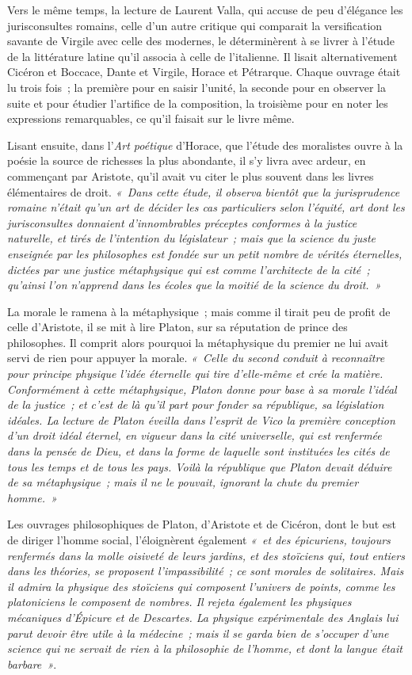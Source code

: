 \documentclass[french,twoside]{book} %
\begin{document}
Vers le même temps, la lecture de Laurent Valla, qui accuse de peu d’élégance les jurisconsultes romains, celle d’un autre critique qui comparait la versification savante de Virgile avec celle des modernes, le déterminèrent à se livrer à l’étude de la littérature latine qu’il associa à celle de l’italienne. Il lisait alternativement Cicéron et Boccace, Dante et Virgile, Horace et Pétrarque. Chaque ouvrage était lu trois fois ; la première pour en saisir l’unité, la seconde pour en observer la suite et pour étudier l’artifice de la composition, la troisième pour en noter les expressions remarquables, ce qu’il faisait sur le livre même.\par
Lisant ensuite, dans l’{\itshape Art poétique} d’Horace, que l’étude des moralistes ouvre à la poésie la source de richesses la plus abondante, il s’y livra avec ardeur, en commençant par Aristote, qu’il avait vu citer le plus souvent dans les livres élémentaires de droit. \emph{« Dans cette étude, il observa bientôt que la jurisprudence romaine n’était qu’un art de décider les cas particuliers selon l’équité,  art dont les jurisconsultes donnaient d’innombrables préceptes conformes à la justice naturelle, et tirés de l’intention du législateur ; mais que la science du juste enseignée par les philosophes est fondée sur un petit nombre de vérités éternelles, dictées par une justice métaphysique qui est comme l’architecte de la cité ; qu’ainsi l’on n’apprend dans les écoles que la moitié de la science du droit. »}\par
La morale le ramena à la métaphysique ; mais comme il tirait peu de profit de celle d’Aristote, il se mit à lire Platon, sur sa réputation de prince des philosophes. Il comprit alors pourquoi la métaphysique du premier ne lui avait servi de rien pour appuyer la morale. \emph{« Celle du second conduit à reconnaître pour principe physique l’idée éternelle qui tire d’elle-même et crée la matière. Conformément à cette métaphysique, Platon donne pour base à sa morale l’idéal de la justice ; et c’est de là qu’il part pour fonder sa république, sa législation idéales. La lecture de Platon éveilla dans l’esprit de Vico la première conception d’un droit idéal éternel, en vigueur dans la cité universelle, qui est renfermée dans la pensée de Dieu, et dans la forme de laquelle sont instituées les cités de tous les temps et de tous les pays. Voilà la république que Platon devait déduire de sa métaphysique ; mais il ne le pouvait, ignorant la chute du premier homme. »}\par
Les ouvrages philosophiques de Platon, d’Aristote et de Cicéron, dont le but est de diriger l’homme social, l’éloignèrent également \emph{« et des épicuriens, toujours renfermés dans la molle oisiveté de leurs jardins, et des stoïciens qui, tout entiers dans les théories, se proposent l’impassibilité ; ce sont morales de solitaires. Mais il admira la physique des stoïciens qui composent l’univers de points, comme les platoniciens le composent de nombres. Il rejeta également les physiques {\itshape mécaniques} d’Épicure et de Descartes. La physique expérimentale des Anglais lui parut devoir être utile à la médecine ; mais il se garda bien de s’occuper d’une science qui ne servait de rien à la philosophie de l’homme, et dont la langue était barbare »}.\par
\end{document}
